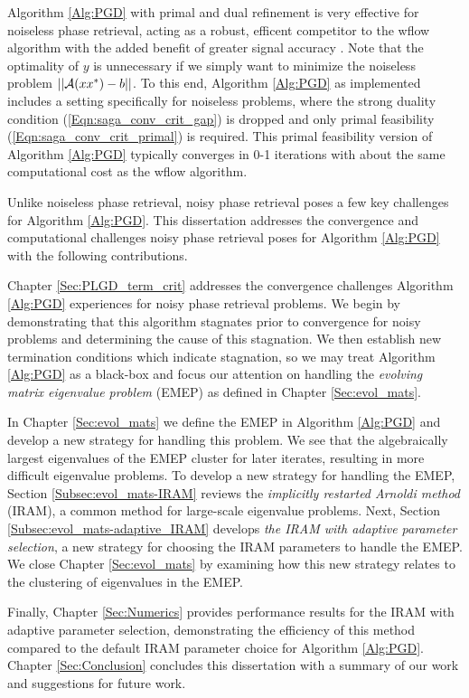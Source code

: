 Algorithm \ref{Alg:PGD} with primal and dual refinement is very effective for noiseless phase retrieval, acting as a robust, efficent competitor to the wflow algorithm with the added benefit of greater signal accuracy \cite[Section 5.1.1, 5.1.3]{DBLP:journals/siamsc/FriedlanderM16}.  Note that the optimality of $y$ is unnecessary if we simply want to minimize the noiseless problem $||{\mathcal A}(xx^*) - b||$.  To this end, Algorithm \ref{Alg:PGD} as implemented includes a setting specifically for noiseless problems, where the strong duality condition (\ref{Eqn:saga_conv_crit_gap}) is dropped and only primal feasibility (\ref{Eqn:saga_conv_crit_primal}) is required.  This primal feasibility version of Algorithm \ref{Alg:PGD} typically converges in 0-1 iterations with about the same computational cost as the wflow algorithm.  



Unlike noiseless phase retrieval, noisy phase retrieval poses a few key challenges for Algorithm \ref{Alg:PGD}.
This dissertation addresses the convergence and computational challenges noisy phase retrieval poses for Algorithm \ref{Alg:PGD} with the following contributions.


Chapter \ref{Sec:PLGD_term_crit} addresses the convergence challenges Algorithm \ref{Alg:PGD} experiences for noisy phase retrieval problems.  
We begin by demonstrating that this algorithm stagnates prior to convergence for noisy problems and determining the cause of this stagnation.  
We then establish new termination conditions which indicate stagnation, so we may treat Algorithm \ref{Alg:PGD} as a black-box and focus our attention on handling the \textit{evolving matrix eigenvalue problem} (EMEP) as defined in Chapter \ref{Sec:evol_mats}.


In Chapter \ref{Sec:evol_mats} we define the EMEP in Algorithm \ref{Alg:PGD} and develop a new strategy for handling this problem.
We see that the algebraically largest eigenvalues of the EMEP cluster for later iterates, resulting in more difficult eigenvalue problems.
To develop a new strategy for handling the EMEP, Section \ref{Subsec:evol_mats-IRAM} reviews the \textit{implicitly restarted Arnoldi method} (IRAM), a common method for large-scale eigenvalue problems. 
Next, Section \ref{Subsec:evol_mats-adaptive_IRAM} develops \textit{the IRAM with adaptive parameter selection}, a new strategy for choosing the IRAM parameters to handle the EMEP.  
We close Chapter \ref{Sec:evol_mats} by examining how this new strategy relates to the clustering of eigenvalues in the EMEP.


Finally, Chapter \ref{Sec:Numerics} provides performance results for the IRAM with adaptive parameter selection, demonstrating the efficiency of this method compared to the default IRAM parameter choice for Algorithm \ref{Alg:PGD}.  
Chapter \ref{Sec:Conclusion} concludes this dissertation with a summary of our work and suggestions for future work.




